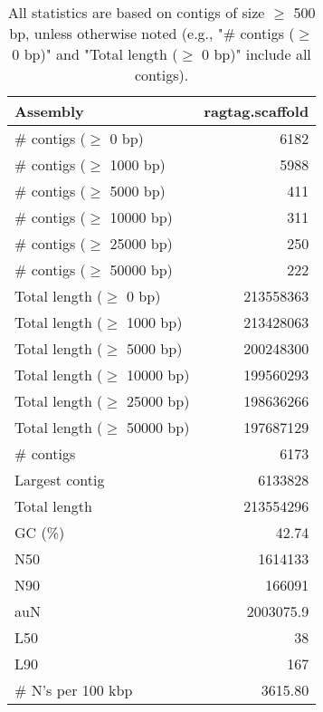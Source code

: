 \documentclass[12pt,a4paper]{article}
\begin{document}
\begin{table}[ht]
\begin{center}
\caption{All statistics are based on contigs of size $\geq$ 500 bp, unless otherwise noted (e.g., "\# contigs ($\geq$ 0 bp)" and "Total length ($\geq$ 0 bp)" include all contigs).}
\begin{tabular}{|l*{1}{|r}|}
\hline
Assembly & ragtag.scaffold \\ \hline
\# contigs ($\geq$ 0 bp) & 6182 \\ \hline
\# contigs ($\geq$ 1000 bp) & 5988 \\ \hline
\# contigs ($\geq$ 5000 bp) & 411 \\ \hline
\# contigs ($\geq$ 10000 bp) & 311 \\ \hline
\# contigs ($\geq$ 25000 bp) & 250 \\ \hline
\# contigs ($\geq$ 50000 bp) & 222 \\ \hline
Total length ($\geq$ 0 bp) & 213558363 \\ \hline
Total length ($\geq$ 1000 bp) & 213428063 \\ \hline
Total length ($\geq$ 5000 bp) & 200248300 \\ \hline
Total length ($\geq$ 10000 bp) & 199560293 \\ \hline
Total length ($\geq$ 25000 bp) & 198636266 \\ \hline
Total length ($\geq$ 50000 bp) & 197687129 \\ \hline
\# contigs & 6173 \\ \hline
Largest contig & 6133828 \\ \hline
Total length & 213554296 \\ \hline
GC (\%) & 42.74 \\ \hline
N50 & 1614133 \\ \hline
N90 & 166091 \\ \hline
auN & 2003075.9 \\ \hline
L50 & 38 \\ \hline
L90 & 167 \\ \hline
\# N's per 100 kbp & 3615.80 \\ \hline
\end{tabular}
\end{center}
\end{table}
\end{document}
